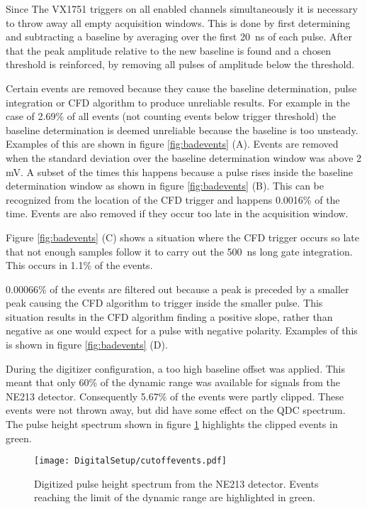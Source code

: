 \documentclass[main.tex]{subfiles}
\begin{document}
Since The VX1751 triggers on all enabled channels simultaneously it is necessary to throw away all empty acquisition windows. This is done by first determining and subtracting a baseline by averaging over the first \si{20\nano\second} of each pulse. After that the peak amplitude relative to the new baseline is found and a chosen threshold is reinforced, by removing all pulses of amplitude below the threshold.

Certain events are removed because they cause the baseline determination, pulse integration or CFD algorithm to produce unreliable results. For example in the case of 2.69\% of all events (not counting events below trigger threshold) the baseline determination is deemed unreliable because the baseline is too unsteady. 
Examples of this are shown in figure \ref{fig:badevents} (A). Events are removed when the standard deviation over the baseline determination window was above 2 mV. A subset of the times this happens because a pulse rises inside the baseline determination window as shown in figure \ref{fig:badevents} (B). This can be recognized from the location of the CFD trigger and happens 0.0016\% of the time. Events are also removed if they occur too late in the acquisition window. 

Figure \ref{fig:badevents} (C) shows a situation where the CFD trigger occurs so late that not enough samples follow it to carry out the \SI{500}{\nano\second} long gate integration. This occurs in 1.1\% of the events.

0.00066\% of the events are filtered out because a peak is preceded by a smaller peak causing the CFD algorithm to trigger inside the smaller pulse. This situation results in the CFD algorithm finding a positive slope, rather than negative as one would expect for a pulse with negative polarity. Examples of this is shown in figure \ref{fig:badevents} (D).

During the digitizer configuration, a too high baseline offset was applied. This meant that only 60\% of the dynamic range was available for signals from the NE213 detector. Consequently 5.67\% of the events were partly clipped. These events were not thrown away, but did have some effect on the QDC spectrum. The pulse height spectrum shown in figure \ref{fig:cutoffevents} highlights the clipped events in green.
\begin{figure}[ht!]
    \centering
        \texttt{[image: DigitalSetup/cutoffevents.pdf]}
        \caption[Digitized pulse height spectrum]{Digitized pulse height spectrum from the NE213 detector. Events reaching the limit of the dynamic range are highlighted in green.}
    \label{fig:cutoffevents} 
\end{figure}
\end{document}

